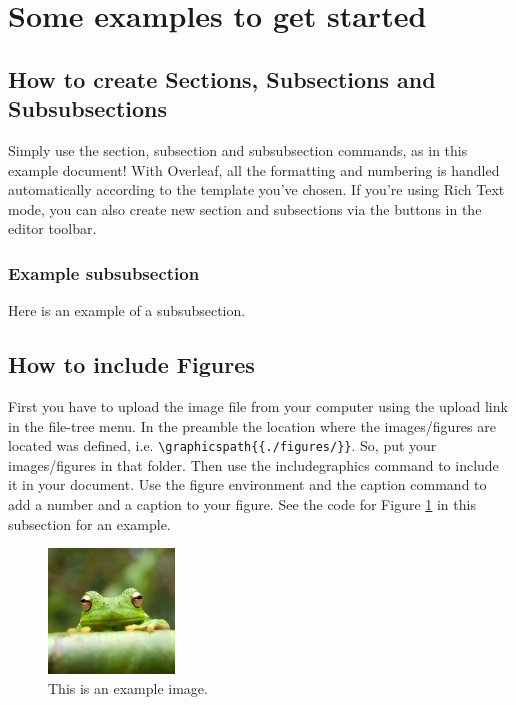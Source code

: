 \documentclass[12pt,a4paper,faculty=ea,language=en,doctype=article]{ugent-doc}
\begin{document}

\section{Some examples to get started}

\subsection{How to create Sections, Subsections and Subsubsections}

Simply use the section, subsection and subsubsection commands, as in this example document! 
With Overleaf, all the formatting and numbering is handled automatically according to the template you've chosen.
If you're using Rich Text mode, you can also create new section and subsections via the buttons in the editor toolbar.

\subsubsection{Example subsubsection}

Here is an example of a subsubsection.

\subsection{How to include Figures}

First you have to upload the image file from your computer using the upload link in the file-tree menu.
In the preamble the location where the images/figures are located was defined, i.e. \verb|\graphicspath{{./figures/}}|.
So, put your images/figures in that folder.
Then use the includegraphics command to include it in your document.
Use the figure environment and the caption command to add a number and a caption to your figure.
See the code for Figure \ref{fig:frog} in this subsection for an example.

\begin{figure}[ht]
    \centering
    \includegraphics[width=0.3\textwidth]{frog.jpg}
    \caption{\label{fig:frog}This is an example image.}
\end{figure}
\end{document}
